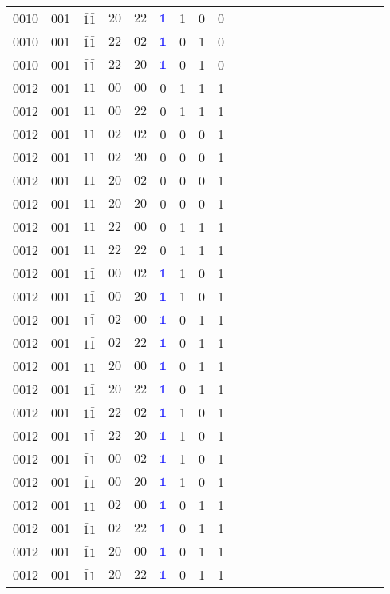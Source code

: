 \begin{longtable*}{c| cccccccccccccccccccc }
0010& 001& $\bar{1}\bar{1}$& $20$& $22$& \textcolor{blue}{$\mathds{1}$}& 1& 0& 0\\
0010& 001& $\bar{1}\bar{1}$& $22$& $02$& \textcolor{blue}{$\mathds{1}$}& 0& 1& 0\\
0010& 001& $\bar{1}\bar{1}$& $22$& $20$& \textcolor{blue}{$\mathds{1}$}& 0& 1& 0\\
0012& 001& $11$& $00$& $00$& 0& 1& 1& 1\\
0012& 001& $11$& $00$& $22$& 0& 1& 1& 1\\
0012& 001& $11$& $02$& $02$& 0& 0& 0& 1\\
0012& 001& $11$& $02$& $20$& 0& 0& 0& 1\\
0012& 001& $11$& $20$& $02$& 0& 0& 0& 1\\
0012& 001& $11$& $20$& $20$& 0& 0& 0& 1\\
0012& 001& $11$& $22$& $00$& 0& 1& 1& 1\\
0012& 001& $11$& $22$& $22$& 0& 1& 1& 1\\
0012& 001& $1\bar{1}$& $00$& $02$& \textcolor{blue}{$\mathds{1}$}& 1& 0& 1\\
0012& 001& $1\bar{1}$& $00$& $20$& \textcolor{blue}{$\mathds{1}$}& 1& 0& 1\\
0012& 001& $1\bar{1}$& $02$& $00$& \textcolor{blue}{$\mathds{1}$}& 0& 1& 1\\
0012& 001& $1\bar{1}$& $02$& $22$& \textcolor{blue}{$\mathds{1}$}& 0& 1& 1\\
0012& 001& $1\bar{1}$& $20$& $00$& \textcolor{blue}{$\mathds{1}$}& 0& 1& 1\\
0012& 001& $1\bar{1}$& $20$& $22$& \textcolor{blue}{$\mathds{1}$}& 0& 1& 1\\
0012& 001& $1\bar{1}$& $22$& $02$& \textcolor{blue}{$\mathds{1}$}& 1& 0& 1\\
0012& 001& $1\bar{1}$& $22$& $20$& \textcolor{blue}{$\mathds{1}$}& 1& 0& 1\\
0012& 001& $\bar{1}1$& $00$& $02$& \textcolor{blue}{$\mathds{1}$}& 1& 0& 1\\
0012& 001& $\bar{1}1$& $00$& $20$& \textcolor{blue}{$\mathds{1}$}& 1& 0& 1\\
0012& 001& $\bar{1}1$& $02$& $00$& \textcolor{blue}{$\mathds{1}$}& 0& 1& 1\\
0012& 001& $\bar{1}1$& $02$& $22$& \textcolor{blue}{$\mathds{1}$}& 0& 1& 1\\
0012& 001& $\bar{1}1$& $20$& $00$& \textcolor{blue}{$\mathds{1}$}& 0& 1& 1\\
0012& 001& $\bar{1}1$& $20$& $22$& \textcolor{blue}{$\mathds{1}$}& 0& 1& 1\\

\end{longtable*}
